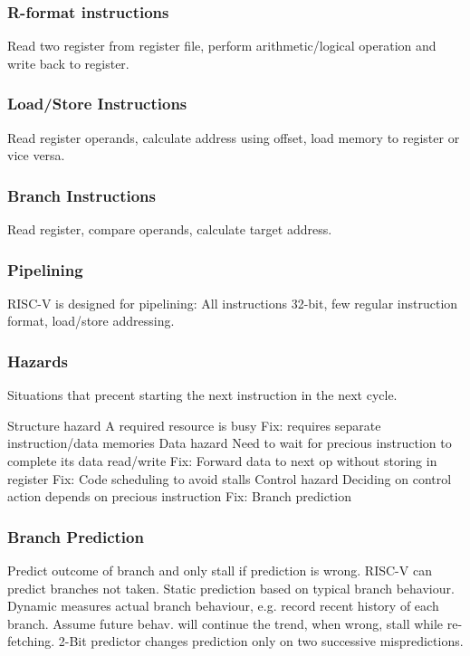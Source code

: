 \documentclass[a4paper, fontsize=8pt, landscape, DIV=1]{scrartcl}
\begin{document}
\begin{multicols*}{4}
  \subsubsection{R-format instructions}
  Read two register from register file, perform arithmetic/logical operation and
  write back to register.

  \subsubsection{Load/Store Instructions}
  Read register operands, calculate address using offset, load memory to register
  or vice versa.

  \subsubsection{Branch Instructions}
  Read register, compare operands, calculate target address.

  \subsubsection{Pipelining}
  RISC-V is designed for pipelining: All instructions 32-bit, few regular instruction
  format, load/store addressing.

  \subsubsection{Hazards}
  Situations that precent starting the next instruction in the next cycle.
  \begin{outline}
    \1 Structure hazard
      \2 A required resource is busy
      \2 Fix: requires separate instruction/data memories
    \1 Data hazard
      \2 Need to wait for precious instruction to complete its data read/write
      \2 Fix: Forward data to next op without storing in register
      \2 Fix: Code scheduling to avoid stalls
    \1 Control hazard
      \2 Deciding on control action depends on precious instruction
      \2 Fix: Branch prediction
  \end{outline}

  \subsubsection{Branch Prediction}
  Predict outcome of branch and only stall if prediction is wrong. RISC-V can predict branches
  not taken. Static prediction based on typical branch behaviour. Dynamic measures actual branch
  behaviour, e.g. record recent history of each branch. Assume future behav. will continue the trend,
  when wrong, stall while re-fetching. 2-Bit predictor changes prediction only on two successive
  mispredictions.


\end{multicols*}
\end{document}
